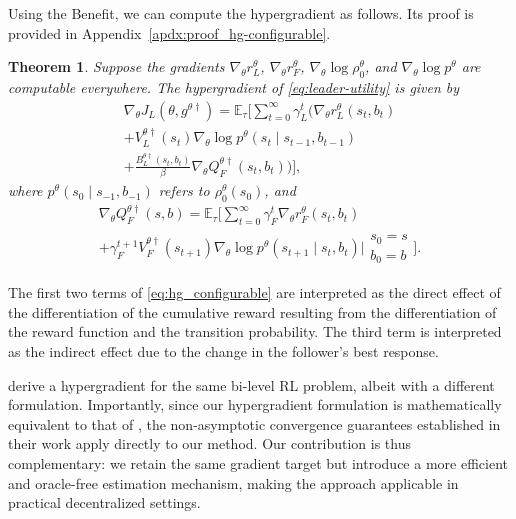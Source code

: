 \documentclass[letterpaper]{article} %
\providecommand{\E}{\mathbb{E}} %
\newtheorem{theorem}{Theorem}
\begin{document}
Using the Benefit, we can compute the hypergradient as follows.
Its proof is provided in Appendix~\ref{apdx:proof_hg-configurable}.
\begin{theorem}%
\label{thm:hg-configurable}
Suppose the gradients $\nabla_{\theta} r_L^{\theta}$, $\nabla_{\theta} r_F^{\theta}$, $\nabla_{\theta} \log \rho_0^{\theta}$, and $\nabla_{\theta} \log p^{\theta}$ are computable everywhere.
The hypergradient of \eqref{eq:leader-utility} is given by
\begin{multline}
    \nabla_{{\theta}}J_L({\theta}, g^{\theta\dagger})
    =\E_\tau\Bigg[\sum_{t=0}^\infty \gamma_L^t \bigg(\nabla_{\theta} r_L^{\theta}(s_t, b_t)\\
    + V_L^{{\theta}\dagger}(s_t) \nabla_{\theta}\log
    p^{\theta} (s_{t} \mid s_{t-1}, b_{t-1})\\
    + \frac{B_L^{{\theta}\dagger}(s_t, b_t)}{\beta} \nabla_{\theta} Q_F^{{\theta} \dagger}(s_t, b_t) \bigg) \Bigg],
\label{eq:hg_configurable}
\end{multline}
where $p^{\theta}(s_0\mid s_{-1},b_{-1})$ refers to $\rho_0^{\theta}(s_0)$, and
\begin{multline}
\nabla_{{\theta}}Q_F^{{\theta}\dag}(s,b) = \E_\tau\Bigg[\sum_{t=0}^\infty\gamma_F^t\nabla_{{\theta}}r_F^{{\theta}}(s_t,b_t)\\
+ \gamma_F^{t+1}V_F^{{\theta}\dag}(s_{t+1})\nabla_{{\theta}}\log p^{{\theta}}(s_{t+1}\mid s_t,b_t) \Bigg|\begin{array}{l}s_0=s\\b_0=b\end{array}\Bigg].\label{eq:nablaQF}
\end{multline}
\end{theorem}
The first two terms of \eqref{eq:hg_configurable} are interpreted as the direct effect of the differentiation of the cumulative reward resulting from the differentiation of the reward function and the transition probability. 
The third term is interpreted as the indirect effect due to the change in the follower's best response. 

\citet{Thoma2024-em} derive a hypergradient for the same bi-level RL problem, albeit with a different formulation.
Importantly, since our hypergradient formulation is mathematically equivalent to that of \citet{Thoma2024-em}, the non-asymptotic convergence guarantees established in their work apply directly to our method.
Our contribution is thus complementary: we retain the same gradient target but introduce a more efficient and oracle-free estimation mechanism, making the approach applicable in practical decentralized settings.
\end{document}
